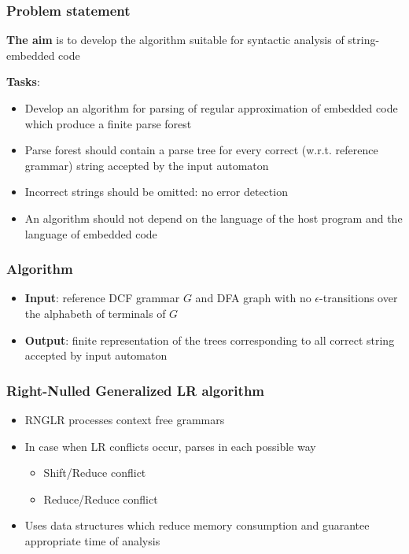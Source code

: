 \documentclass{beamer}
\begin{document}
\begin{frame}
  \transwipe[direction=90]
  \frametitle{Problem statement}
  \textbf{The aim} is to develop the algorithm suitable for syntactic analysis of string-embedded code  
  
  \textbf{Tasks}:
  \begin{itemize}
    \item Develop an algorithm for parsing of regular approximation of embedded 
code which produce a finite parse forest
    \item Parse forest should contain a parse tree for every correct (w.r.t. 
reference grammar) string accepted by the input automaton
    \item Incorrect strings should be omitted: no error detection
    \item An algorithm should not depend on the language of the host program 
and the language of embedded code
  \end{itemize}
\end{frame}
            
\begin{frame}
  \transwipe[direction=90]
  \frametitle{Algorithm}
  \begin{itemize}
    \item \textbf{Input}: reference DCF grammar $G$ and DFA graph with no 
$\epsilon$-transitions over the alphabeth of terminals of $G$
    \item \textbf{Output}: finite representation of the trees corresponding to 
all correct string accepted by input automaton
  \end{itemize}
\end{frame}

\begin{frame}
  \transwipe[direction=90]
  \frametitle{Right-Nulled Generalized LR algorithm}
  \begin{itemize}
    \item RNGLR processes context free grammars
    \item In case when LR conflicts occur, parses in each possible way
    \begin{itemize}
      \item Shift/Reduce conflict
      \item Reduce/Reduce conflict
    \end{itemize}
    \item Uses data structures which reduce memory consumption and guarantee 
appropriate time of analysis
  \end{itemize}
\end{frame}
\end{document}
